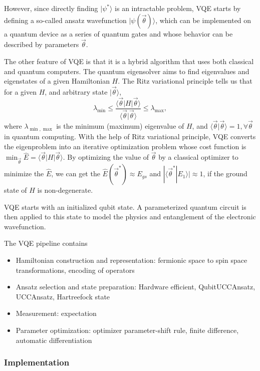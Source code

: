 However, since directly finding $|\psi^*\rangle$ is an intractable problem, VQE starts by defining a so-called ansatz wavefunction $|\psi(\vec{\theta})\rangle$, which can be implemented on a quantum device as a series of quantum gates and whose behavior can be described by parameters $\vec{\theta}$.

The other feature of VQE is that it is a hybrid algorithm that uses both classical and quantum computers.
The quantum eigensolver aims to find eigenvalues and eigenstates of a given Hamiltonian $H$.
The Ritz variational principle tells us that for a given $H$, and arbitrary state $|\vec{\theta}\rangle$,
\begin{equation}
    \lambda_{\min}\leq \frac{\langle \vec{\theta} |H| \vec{\theta}\rangle}{\langle \vec{\theta}|\vec{\theta}\rangle} \leq \lambda_{\max},
\end{equation}
where $\lambda_{\min, \max}$ is the minimum (maximum) eigenvalue of $H$, and $\langle \vec{\theta}|\vec{\theta}\rangle = 1, \forall \vec{\theta}$ in quantum computing.
With the help of Ritz variational principle, VQE converts the eigenproblem into an iterative optimization problem whose cost function is $\min_{\vec{\theta}}\hat{E}= \langle \vec{\theta} |H| \vec{\theta}\rangle$.
By optimizing the value of $\vec{\theta}$ by a classical optimizer to minimize the $\hat{E}$, we can get the $\hat{E}(\vec{\theta}^*)\approx E_{gs}$ and $|\langle \vec{\theta}^*|E_1\rangle| \approx 1$, if the ground state of $H$ is non-degenerate.

VQE starts with an initialized qubit state. A parameterized quantum circuit is then applied to this state to model the physics and entanglement of the electronic wavefunction.

The VQE pipeline contains
\begin{itemize}
    \item Hamiltonian construction and representation: fermionic space to spin space transformations, encoding of operators
    \item Ansatz selection and state preparation: Hardware efficient, QubitUCCAnsatz, UCCAnsatz, Hartreefock state
    \item Measurement: expectation
    \item Parameter optimization: optimizer parameter-shift rule, finite difference, automatic differentiation
\end{itemize}

\subsubsection{Implementation}

